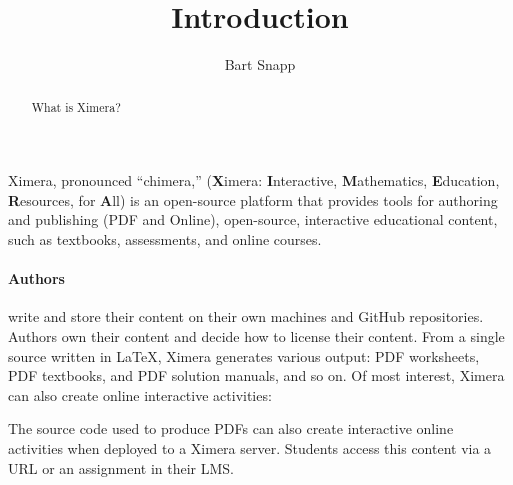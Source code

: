 \documentclass{ximera}
\title{Introduction}
\author{Bart Snapp}
\begin{document}
\begin{abstract}
    What is Ximera?
\end{abstract}
\maketitle

Ximera, pronounced ``chimera,'' (\textbf{X}imera: \textbf{I}nteractive,
\textbf{M}athematics, \textbf{E}ducation,
\textbf{R}esources, for \textbf{A}ll) is an open-source platform that provides
tools for
authoring and publishing (PDF and Online), open-source, interactive educational
content, such as textbooks, assessments, and online courses.

\paragraph{Authors}  write and store their content on their own
machines and GitHub repositories.
Authors own their content and decide how to license their content. From a
single source written in \LaTeX, Ximera generates various output: PDF
worksheets,
PDF textbooks, and	PDF solution manuals, and so on. Of most interest,
Ximera can
also create online interactive activities:
\begin{center}
\end{center}
The source code used to produce PDFs can also create interactive online
activities when deployed to a Ximera server. Students access this content via a
URL or an assignment in their LMS.
\end{document}
